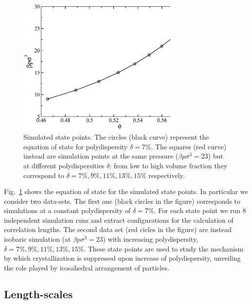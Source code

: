 \documentclass[twocolumn,superscriptaddress]{revtex4-1}
\begin{document}
\begin{figure}
 \centering
 \includegraphics[width=8cm]{./figures/eos.eps}
 \caption{Simulated state points. The circles (black curve) represent the equation of state
for polydispersity $\delta=7\%$. The squares (red curve) instead are simulation points at the same
pressure ($\beta p\sigma^3=23$) but at different polydispersities $\delta$: from low to high
volume fraction they correspond to $\delta=7\%,9\%,11\%,13\%,15\%$ respectively.}
 \label{fig:eos}
\end{figure}


Fig.~\ref{fig:eos} shows the equation of state for the simulated state points. In particular
we consider two data-sets. The first one (black circles in the figure) corresponds to
simulations at a constant polydispersity of $\delta=7\%$. For each state point we run $8$ independent
simulation runs and extract configurations for the calculation of correlation lengths.
The second data set (red cicles in the figure) are instead isobaric simulation (at $\beta p\sigma^3=23$)
with increasing polydispersity, $\delta=7\%,9\%,11\%,13\%,15\%$. These state points are used to study
the mechanism by which crystallization is suppressed upon increase of polydispersity, unveiling the
role played by icosahedral arrangement of particles.

\subsection{Length-scales}
\end{document}
